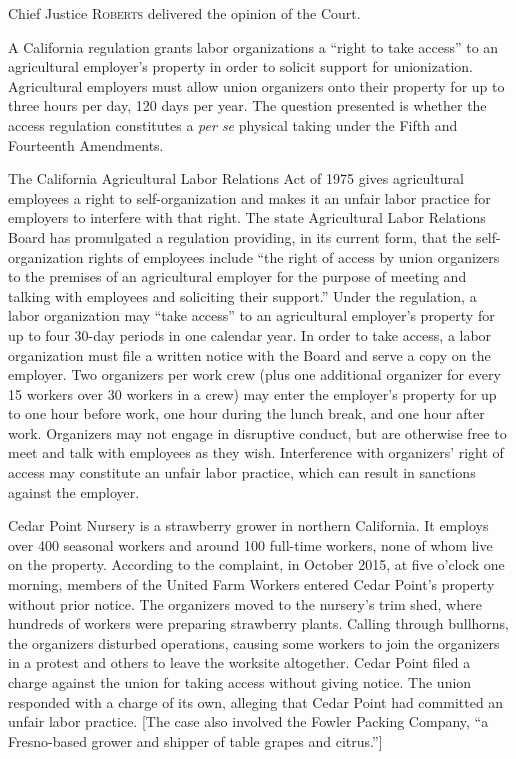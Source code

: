 

\opinion Chief Justice \textsc{Roberts} delivered the opinion of the Court.

A California regulation grants labor organizations a ``right to take access'' to
an agricultural employer's property in order to solicit support for
unionization. Agricultural employers must allow union organizers onto their
property for up to three hours per day, 120 days per year. The question
presented is whether the access regulation constitutes a \textit{per se}
physical taking under the Fifth and Fourteenth Amendments.



The California Agricultural Labor Relations Act of 1975 gives agricultural
employees a right to self-organization and makes it an unfair labor practice for
employers to interfere with that right. The state Agricultural Labor Relations
Board has promulgated a regulation providing, in its current form, that the
self-organization rights of employees include ``the right of access by union
organizers to the premises of an agricultural employer for the purpose of
meeting and talking with employees and soliciting their support.'' Under the
regulation, a labor organization may ``take access'' to an agricultural
employer's property for up to four 30-day periods in one calendar year. In order
to take access, a labor organization must file a written notice with the Board
and serve a copy on the employer. Two organizers per work crew (plus one
additional organizer for every 15 workers over 30 workers in a crew) may enter
the employer's property for up to one hour before work, one hour during the
lunch break, and one hour after work. Organizers may not engage in disruptive
conduct, but are otherwise free to meet and talk with employees as they wish.
Interference with organizers' right of access may constitute an unfair labor
practice, which can result in sanctions against the employer.


Cedar Point Nursery is a strawberry grower in northern California. It employs
over 400 seasonal workers and around 100 full-time workers, none of whom live on
the property. According to the complaint, in October 2015, at five o'clock one
morning, members of the United Farm Workers entered Cedar Point's property
without prior notice. The organizers moved to the nursery's trim shed, where
hundreds of workers were preparing strawberry plants. Calling through bullhorns,
the organizers disturbed operations, causing some workers to join the organizers
in a protest and others to leave the worksite altogether. Cedar Point filed a
charge against the union for taking access without giving notice. The union
responded with a charge of its own, alleging that Cedar Point had committed an
unfair labor practice. [The case also involved the Fowler Packing Company, ``a
Fresno-based grower and shipper of table grapes and citrus.'']


